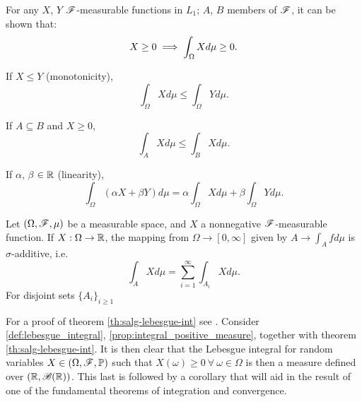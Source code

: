 \documentclass[../TGMAFFIRO.tex]{subfiles}
\begin{document}
\begin{proposition} \label{prop:lebesgue_integral_props}
	For any $X$, $Y$ $\mathscr{F}$-measurable functions in $L_1$; $A$, $B$ members of $\mathscr{F}$, it can be shown that:
	\begin{equation}\label{prop:integral_positive_measure}
		X \geq 0 \implies \int_\Omega X d\mu \geq 0. \\
	\end{equation}
	
	If $X \leq Y$ (monotonicity),
	\begin{equation}
		\int_\Omega X d\mu \leq \int_\Omega Y d\mu.
	\end{equation}
	
	If $A \subseteq B$ and $X \geq 0$,
	\begin{equation}
		\int_A X d\mu \leq \int_B X d\mu.
	\end{equation}
	
	If $\alpha$, $\beta$ $\in \mathbb{R}$ (linearity),
	\begin{equation}
	\int_\Omega (\alpha X + \beta Y) d\mu = \alpha \int_\Omega X d\mu + \beta \int_\Omega Y d\mu.
	\end{equation}
\end{proposition}


\begin{theorem} \label{th:salg-lebesgue-int}
	Let $(\Omega, \mathscr{F}, \mu)$ be a measurable space, and $X$ a nonnegative $\mathscr{F}$-measurable function. If $X: \Omega \to \mathbb{R}$, the mapping from $\Omega \to [0, \infty]$ given by $A \to \int_A f d\mu$ is $\sigma$-additive, i.e.
	\begin{equation}
		\int_A X d\mu = \sum_{i=1}^{\infty}\int_{A_i} X d\mu.
	\end{equation}
	For disjoint sets $\{A_i\}_{i\geq1}$
\end{theorem}

For a proof of theorem \ref{th:salg-lebesgue-int} see . Consider \ref{def:lebesgue_integral}, \ref{prop:integral_positive_measure}, together with theorem \ref{th:salg-lebesgue-int}. It is then clear that the Lebesgue integral for random variables $X \in (\Omega, \mathscr{F}, \mathbb{P})$ such that $X(\omega) \geq 0 \ \forall \ \omega \in \Omega$ is then a measure defined over $(\mathbb{R}, \mathscr{B}(\mathbb{R}))$. This last is followed by a corollary that will aid in the result of one of the fundamental theorems of integration and convergence. 
\end{document}
